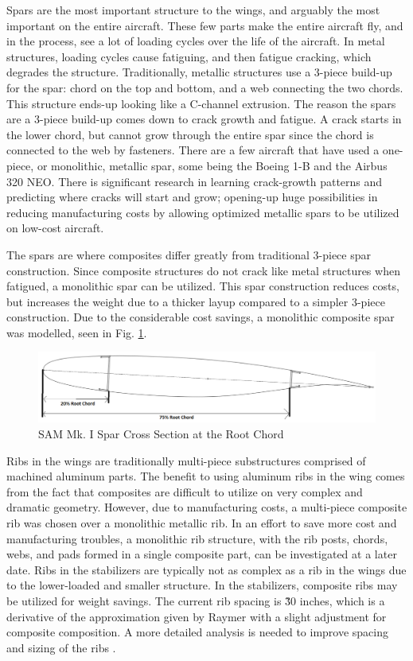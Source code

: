 Spars are the most important structure to the wings, and arguably the most important on the entire aircraft. These few parts make the entire aircraft fly, and in the process, see a lot of loading cycles over the life of the aircraft. In metal structures, loading cycles cause fatiguing, and then fatigue cracking, which degrades the structure. Traditionally, metallic structures use a 3-piece build-up for the spar: chord on the top and bottom, and a web connecting the two chords. This structure ends-up looking like a C-channel extrusion. The reason the spars are a 3-piece build-up comes down to crack growth and fatigue. A crack starts in the lower chord, but cannot grow through the entire spar since the chord is connected to the web by fasteners. There are a few aircraft that have used a one-piece, or monolithic, metallic spar, some being the Boeing 1-B and the Airbus 320 NEO. There is significant research in learning crack-growth patterns and predicting where cracks will start and grow; opening-up huge possibilities in reducing manufacturing costs by allowing optimized metallic spars to be utilized on low-cost aircraft.

\newpage
The spars are where composites differ greatly from traditional 3-piece spar construction. Since composite structures do not crack like metal structures when fatigued, a monolithic spar can be utilized. This spar construction reduces costs, but increases the weight due to a thicker layup compared to a simpler 3-piece construction. Due to the considerable cost savings, a monolithic composite spar was modelled, seen in Fig. \ref{fig:spar_layout}.

\begin{figure}[!h]
    \centering
    \includegraphics[width=\linewidth]{Photos/structuresandloads/Spar Layout.PNG}
    \caption{SAM Mk. I Spar Cross Section at the Root Chord}
    \label{fig:spar_layout}
\end{figure}

Ribs in the wings are traditionally multi-piece substructures comprised of machined aluminum parts. The benefit to using aluminum ribs in the wing comes from the fact that composites are difficult to utilize on very complex and dramatic geometry. However, due to manufacturing costs, a multi-piece composite rib was chosen over a monolithic metallic rib. In an effort to save more cost and manufacturing troubles, a monolithic rib structure, with the rib posts, chords, webs, and pads formed in a single composite part, can be investigated at a later date. Ribs in the stabilizers are typically not as complex as a rib in the wings due to the lower-loaded and smaller structure. In the stabilizers, composite ribs may be utilized for weight savings. The current rib spacing is \~30 inches, which is a derivative of the approximation given by Raymer with a slight adjustment for composite composition. A more detailed analysis is needed to improve spacing and sizing of the ribs \cite{raymer}.


